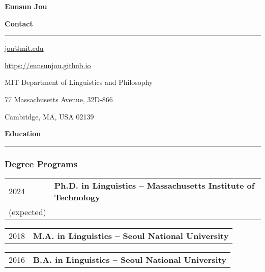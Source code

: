 \documentclass[11pt]{article}
\newcommand{\sect}[1]{{\fontsize{15}{25}\selectfont \textbf{#1}} {\vspace{0.1cm}} \hrule {\vspace{0.3cm}}}
\begin{document}
\begin{center}
{\Large \textbf{Eunsun Jou}}
\end{center}

\thispagestyle{firstpage}

\sect{Contact}

\begin{minipage}[t]{0.5\textwidth}
\begin{flushleft}
\href{mailto:jou@mit.edu}{jou@mit.edu}

\href{https://eunsunjou.github.io}{https://eunsunjou.github.io}
\end{flushleft}
\end{minipage}
\begin{minipage}[t]{0.5\textwidth}
\begin{flushright}
MIT Department of Linguistics and Philosophy

77 Massachusetts Avenue, 32D-866

Cambridge, MA, USA 02139
\end{flushright}
\end{minipage}


\vspace{1cm}

\sect{Education}

\subsubsection*{Degree Programs}
\begin{tabular}{p{}|p{}}
    {2024}&{\textbf{Ph.D. in Linguistics -- Massachusetts Institute of Technology}}\\
    {(expected)}&{}\\
\end{tabular}

\vspace{0.2cm}

\begin{tabular}{p{}|p{}}
	{2018}&{\textbf{M.A. in Linguistics -- Seoul National University}}\\
 \end{tabular}

\vspace{0.2cm}

\begin{tabular}{p{}|p{}}
   {2016}&{\textbf{B.A. in Linguistics -- Seoul National University}}\\
\end{tabular}
\end{document}
